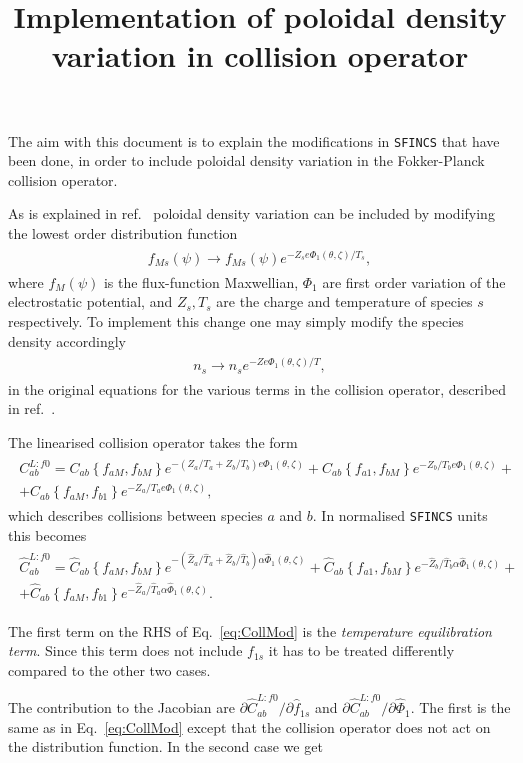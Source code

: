\documentclass[12pt]{article}
\title{Implementation of poloidal density variation in collision operator}
\newcommand{\eq}[1]{\begin{align*}\begin{gathered}#1\end{gathered}\end{align*}}
\newcommand{\eqre}[1]{\begin{align}\begin{gathered}#1\end{gathered}\end{align}}
\begin{document}
\titlepage

\maketitle

The aim with this document is to explain the modifications in \texttt{SFINCS} that have been done, in order to include poloidal density variation in the Fokker-Planck collision operator. 

As is explained in ref.~\cite{ref:PolVarColl_stefan} poloidal density variation can be included by modifying the lowest order distribution function 
\eq{
f_{Ms}(\psi) \rightarrow f_{Ms}(\psi)e^{-Z_se\Phi_1(\theta,\zeta)/T_s},
}
where $f_M(\psi)$ is the flux-function Maxwellian, $\Phi_1$ are first order variation of the electrostatic potential, and $Z_s,T_s$ are the charge and temperature of species $s$ respectively. To implement this change one may simply modify the species density accordingly
\eq{
n_s \rightarrow n_se^{-Ze\Phi_1(\theta,\zeta)/T},
}
in the original equations for the various terms in the collision operator, described in ref.~\cite{ref:Coll1}.

The linearised collision operator takes the form
\eqre{
C_{ab}^{L:f0} =  C_{ab}\left\{f_{aM},f_{bM}\right\}e^{-\left(Z_a/T_a + Z_b/T_b\right)e\Phi_1(\theta,\zeta)} + C_{ab}\left\{f_{a1},f_{bM}\right\}e^{-Z_b/T_be\Phi_1(\theta,\zeta)} + \\ + C_{ab}\left\{f_{aM},f_{b1}\right\}e^{-Z_a/T_ae\Phi_1(\theta,\zeta)},
}
which describes collisions between species $a$ and $b$. In normalised \texttt{SFINCS} units this becomes
\eqre{
\label{eq:CollMod}
\hat C_{ab}^{L:f0} = \hat C_{ab}\left\{f_{aM},f_{bM}\right\}e^{-\left(\hat Z_a/\hat T_a + \hat Z_b/\hat T_b\right) \alpha\hat\Phi_1(\theta,\zeta)} + \hat C_{ab}\left\{f_{a1},f_{bM}\right\}e^{-\hat Z_b/\hat T_b \alpha\hat\Phi_1(\theta,\zeta)} + \\ + \hat C_{ab}\left\{f_{aM},f_{b1}\right\}e^{-\hat Z_a/\hat T_a\alpha\hat\Phi_1(\theta,\zeta)}.
}

\noindent
The first term on the RHS of Eq.~\eqref{eq:CollMod} is the \textit{temperature equilibration term}. Since this term does not include $f_{1s}$ it has to be treated differently compared to the other two cases. 

The contribution to the Jacobian are $\partial \hat C_{ab}^{L:f0}/\partial \hat f_{1s}$ and $\partial \hat C_{ab}^{L:f0}/\partial \hat \Phi_1$. The first is the same as in Eq.~\eqref{eq:CollMod} except that the collision operator does not act on the distribution function. In the second case we get 
\end{document}
